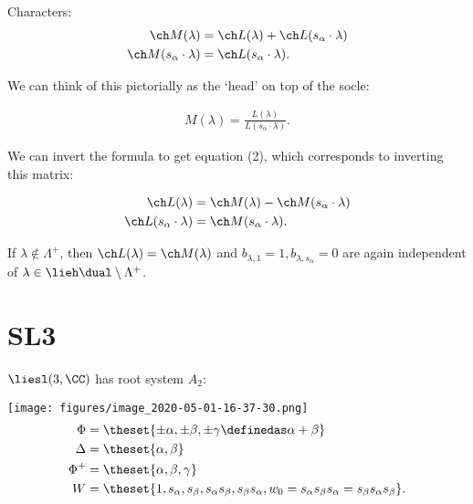 \begin{center}
\end{center}

Characters: \begin{align*}
\ch M(\lambda) &= \ch L(\lambda) + \ch L(s_\alpha \cdot \lambda) \\
\ch M(s_\alpha \cdot \lambda) &= \ch L(s_\alpha \cdot \lambda)
.\end{align*}

We can think of this pictorially as the `head' on top of the socle:

\begin{align*}
M(\lambda) = \frac{L(\lambda)}{L(s_\alpha \cdot \lambda)}
.\end{align*}

We can invert the formula to get equation (2), which corresponds to
inverting this matrix:

\begin{align*}
\ch L(\lambda) &= \ch M(\lambda) - \ch M(s_\alpha \cdot \lambda) \\
\ch L(s_\alpha \cdot \lambda) &= \ch M(s_\alpha \cdot \lambda)
.\end{align*}

If \(\lambda \not\in\Lambda^+\), then
\(\ch L(\lambda) = \ch M(\lambda)\) and
\(b_{\lambda, 1} = 1, b_{\lambda, s_\alpha} = 0\) are again independent
of \(\lambda \in \lieh\dual \setminus \Lambda^+\).

\hypertarget{sl3}{%
\section{SL3}\label{sl3}}

\(\liesl(3, \CC)\) has root system \(A_2\):

\texttt{[image: figures/image\_2020-05-01-16-37-30.png]}\\

\begin{align*}
\Phi &= \theset{\pm \alpha, \pm \beta, \pm\gamma \definedas \alpha + \beta} \\
\Delta &= \theset{\alpha, \beta} \\
\Phi^+ &= \theset{\alpha, \beta, \gamma} \\
W &= \theset{1, s_\alpha, s_\beta, s_\alpha s_\beta, s_\beta s_\alpha, w_0 = s_\alpha s_\beta s_\alpha = s_\beta s_\alpha s_\beta}
.\end{align*}

